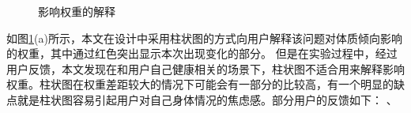 \begin{figure}[htbp]
    \centering
    \caption{影响权重的解释}
    \label{fig:question_weight}
\end{figure}

如图\ref{fig:question_weight}(a)所示，本文在设计中采用柱状图的方式向用户解释该问题对体质倾向影响的权重，其中通过红色突出显示本次出现变化的部分。
但是在实验过程中，经过用户反馈，本文发现在和用户自己健康相关的场景下，柱状图不适合用来解释影响权重。柱状图在权重差距较大的情况下可能会有一部分的比较高，有一个明显的缺点就是柱状图容易引起用户对自己身体情况的焦虑感。部分用户的反馈如下：
、

